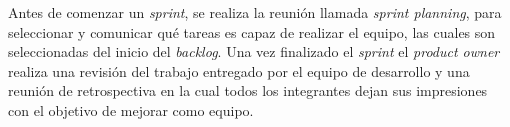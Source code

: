 Antes de comenzar un \textit{sprint}, se realiza la reunión llamada \textit{sprint planning}, para seleccionar y comunicar qué tareas es capaz de realizar el equipo, las cuales son seleccionadas del inicio del \textit{backlog}. Una vez finalizado el \textit{sprint} el \textit{product owner} realiza una revisión del trabajo entregado por el equipo de desarrollo y una reunión de retrospectiva en la cual todos los integrantes dejan sus impresiones con el objetivo de mejorar como equipo.





